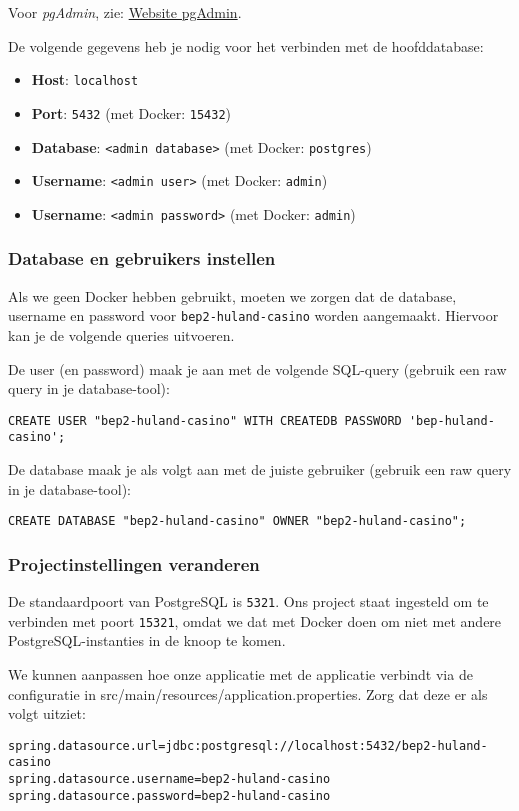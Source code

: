 \documentclass[dutch,a4paper,12pt,doubleside]{book}
\begin{document}
Voor \textit{pgAdmin}, zie: \href{https://www.pgadmin.org/}{Website pgAdmin}.

De volgende gegevens heb je nodig voor het verbinden met de hoofddatabase:
\begin{itemize}
    \item \textbf{Host}: \texttt{localhost}
    \item \textbf{Port}: \texttt{5432} (met Docker: \texttt{15432})
    \item \textbf{Database}: \texttt{<admin database>} (met Docker: \texttt{postgres})
    \item \textbf{Username}: \texttt{<admin user>} (met Docker: \texttt{admin})
    \item \textbf{Username}: \texttt{<admin password>} (met Docker: \texttt{admin})
\end{itemize}

\subsubsection{Database en gebruikers instellen}
Als we geen Docker hebben gebruikt, moeten we zorgen dat de database, username en password voor \texttt{bep2-huland-casino}
worden aangemaakt. Hiervoor kan je de volgende queries uitvoeren.

De user (en password) maak je aan met de volgende SQL-query (gebruik een raw query in je database-tool):
\begin{verbatim}
CREATE USER "bep2-huland-casino" WITH CREATEDB PASSWORD 'bep-huland-casino';
\end{verbatim}

De database maak je als volgt aan met de juiste gebruiker (gebruik een raw query in je database-tool): 
\begin{verbatim}
CREATE DATABASE "bep2-huland-casino" OWNER "bep2-huland-casino";
\end{verbatim}

\subsubsection{Projectinstellingen veranderen}
De standaardpoort van PostgreSQL is \texttt{5321}. 
Ons project staat ingesteld om te verbinden met poort \texttt{15321}, omdat we 
dat met Docker doen om niet met andere PostgreSQL-instanties in de knoop te komen.

We kunnen aanpassen hoe onze applicatie met de applicatie verbindt via 
de configuratie in src/main/resources/application.properties.
Zorg dat deze er als volgt uitziet:
\begin{verbatim}
spring.datasource.url=jdbc:postgresql://localhost:5432/bep2-huland-casino
spring.datasource.username=bep2-huland-casino
spring.datasource.password=bep2-huland-casino
\end{verbatim}
\end{document}
